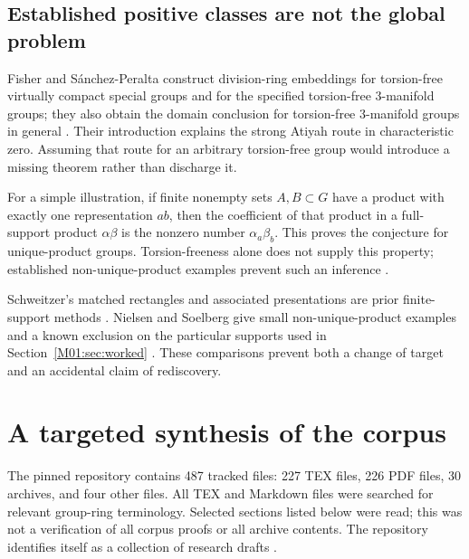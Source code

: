 \documentclass[11pt,a4paper,oneside]{report}
\theoremstyle{definition}
\theoremstyle{remark}
\begin{document}
\subsection{Established positive classes are not the global problem}

Fisher and S\'anchez-Peralta construct division-ring embeddings for
torsion-free virtually compact special groups and for the specified
torsion-free 3-manifold groups; they also obtain the domain conclusion for
torsion-free 3-manifold groups in general \cite{B:FSP}. Their introduction
explains the strong Atiyah route in characteristic zero. Assuming that
route for an arbitrary torsion-free group would introduce a missing
theorem rather than discharge it.

For a simple illustration, if finite nonempty sets $A,B\subset G$ have a
product with exactly one representation $ab$, then the coefficient of that
product in a full-support product $\alpha\beta$ is the nonzero number
$\alpha_a\beta_b$. This proves the conjecture for unique-product groups.
Torsion-freeness alone does not supply this property; established
non-unique-product examples prevent such an inference \cite{B:RipsSegev,B:NS}.

Schweitzer's matched rectangles and associated presentations are prior
finite-support methods \cite{B:Schweitzer}. Nielsen and Soelberg give
small non-unique-product examples and a known exclusion on the particular
supports used in Section~\ref{M01:sec:worked} \cite{B:NS}. These comparisons
prevent both a change of target and an accidental claim of rediscovery.

\section{A targeted synthesis of the corpus}

The pinned repository contains 487 tracked files: 227 TEX files, 226 PDF
files, 30 archives, and four other files. All TEX and Markdown files were
searched for relevant group-ring terminology. Selected sections listed
below were read; this was not a verification of all corpus proofs or all
archive contents. The repository identifies itself as a collection of
research drafts \cite{B:Corpus}.
\end{document}
